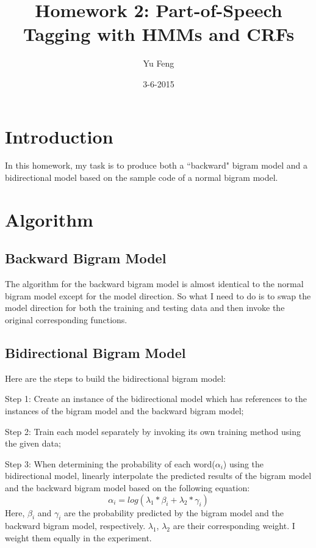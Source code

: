 \documentclass[10pt]{report}
\title{Homework 2: Part-of-Speech Tagging with HMMs and CRFs}
\author{Yu Feng}
\date{3-6-2015}
\begin{document}
\maketitle

\section{Introduction}
In this homework, my task is to produce both a ``backward" bigram model and a bidirectional model based on the sample code of a normal bigram model. 
 
\section{Algorithm}\label{sec:alg}

\subsection{Backward Bigram Model}

The algorithm for the backward bigram model is almost identical to the normal bigram model except for the model direction. So what I need to do is to swap the model direction for both the training and testing data and then invoke the original corresponding functions. 


\subsection{Bidirectional Bigram Model}

Here are the steps to build the bidirectional bigram model:

Step 1: Create an instance of the bidirectional model which has references to the instances of the bigram model and the backward bigram model;

Step 2: Train each model separately by invoking its own training method using the given data;

Step 3: When determining the probability of each word($\alpha_i$) using the bidirectional model, linearly interpolate the predicted results of the bigram model and the backward bigram model based on the following equation:
\[
  \alpha_{i} = log(\lambda_{1} * \beta_{i} + \lambda_{2} * \gamma_{i})
\] 
Here, $\beta_{i}$ and $\gamma_{i}$ are the probability predicted by the bigram model and the backward bigram model, respectively. $\lambda_{1}$, $\lambda_{2}$ are their corresponding weight. I weight them equally in the experiment. 
\end{document}
